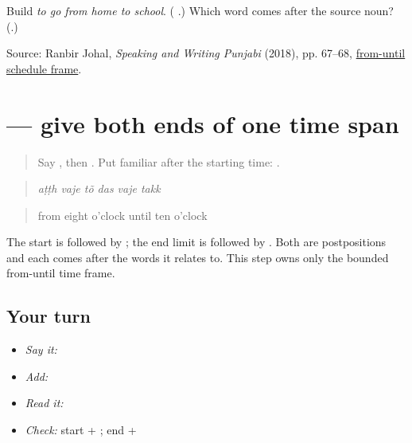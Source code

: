 \begin{tcolorbox}[breakable,colback=teal!4,colframe=teal!35!black,title={Before you move on}]
Build \emph{to go from home to school}. (\textbf{   }.) Which word comes after the source noun? (\textbf{}.)

Source: Ranbir Johal, \emph{Speaking and Writing Punjabi} (2018), pp. 67–68, \href{https://openlibrary-repo.ecampusontario.ca/jspui/bitstream/123456789/492/2/2018Pun1100CoursePackage.pdf}{from-until schedule frame}.
\end{tcolorbox}
\section[\texorpdfstring{\pa{ਅੱਠ} \pa{ਵਜੇ} \pa{ਤੋਂ} \pa{ਦਸ} \pa{ਵਜੇ} \pa{ਤੱਕ} (atth vaje ton …)}{ਅੱਠ ਵਜੇ ਤੋਂ ਦਸ ਵਜੇ ਤੱਕ (atth vaje ton …)}]{      — give both ends of one time span}

\label{lesson:PA-C178-tak}



\begin{quote}
Say \textbf{ }, then \textbf{ }. Put familiar \textbf{} after the starting time: \textbf{  }.
\end{quote}

\begin{grammarlens}[title={Grammar Lens: \pa{ਤੱਕ} follows the end limit}]
\begin{quote}
\textbf{     }
\end{quote}

\begin{quote}
\emph{aṭṭh vaje tõ das vaje takk}
\end{quote}

\begin{quote}
from eight o'clock until ten o'clock
\end{quote}

The start is followed by \textbf{}; the end limit is followed by \textbf{}. Both are postpositions and each comes after the words it relates to. This step owns only the bounded from-until time frame.
\end{grammarlens}

\subsection*{Your turn}
\begin{itemize}
\raggedright
  \item \emph{Say it:} \textbf{  }
  \item \emph{Add:} \textbf{  }
  \item \emph{Read it:} \textbf{     }
  \item \emph{Check:} start + \textbf{}; end + \textbf{}
\end{itemize}

